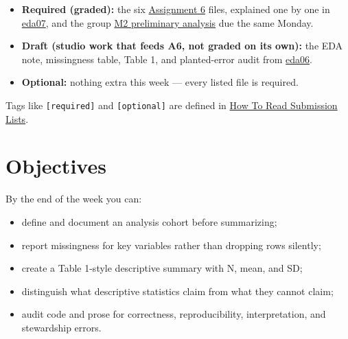 \documentclass[
  letterpaper,
  DIV=11,
  numbers=noendperiod,
  oneside]{scrreprt}
\providecommand{\tightlist}{%
  \setlength{\itemsep}{0pt}\setlength{\parskip}{0pt}}
\begin{document}
\begin{tcolorbox}[enhanced jigsaw, title=\textcolor{quarto-callout-important-color}{\faExclamation}\hspace{0.5em}{Required / Draft / Optional This Week}, arc=.35mm, toptitle=1mm, colframe=quarto-callout-important-color-frame, toprule=.15mm, leftrule=.75mm, bottomtitle=1mm, opacityback=0, bottomrule=.15mm, coltitle=black, breakable, opacitybacktitle=0.6, titlerule=0mm, colback=white, left=2mm, colbacktitle=quarto-callout-important-color!10!white, rightrule=.15mm]

\begin{itemize}
\tightlist
\item
  \textbf{Required (graded):} the six
  \href{../../assignments/assignment06-eda-ai-audit/README.md}{Assignment
  6} files, explained one by one in
  \href{eda07-assignment-a6-and-reference.qmd}{eda07}, and the group
  \href{../../milestones/m2-preliminary-analysis/README.md}{M2
  preliminary analysis} due the same Monday.
\item
  \textbf{Draft (studio work that feeds A6, not graded on its own):} the
  EDA note, missingness table, Table 1, and planted-error audit from
  \href{eda06-studio-planted-errors.qmd}{eda06}.
\item
  \textbf{Optional:} nothing extra this week --- every listed file is
  required.
\end{itemize}

Tags like \texttt{{[}required{]}} and \texttt{{[}optional{]}} are
defined in \hyperref[how-to-read-submission-lists]{How To Read
Submission Lists}.

\end{tcolorbox}

\section*{Objectives}\label{objectives-1}


By the end of the week you can:

\begin{itemize}
\tightlist
\item
  define and document an analysis cohort before summarizing;
\item
  report missingness for key variables rather than dropping rows
  silently;
\item
  create a Table 1-style descriptive summary with N, mean, and SD;
\item
  distinguish what descriptive statistics claim from what they cannot
  claim;
\item
  audit code and prose for correctness, reproducibility, interpretation,
  and stewardship errors.
\end{itemize}
\end{document}
